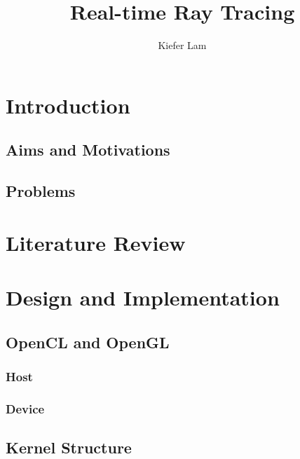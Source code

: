 \documentclass[final]{cmpreport}
\title{Real-time Ray Tracing}
\author{Kiefer Lam}
\begin{document}
\section{Introduction}

\subsection{Aims and Motivations}

\subsection{Problems}

\section{Literature Review}

\section{Design and Implementation}

\subsection{OpenCL and OpenGL}
\subsubsection{Host}

\subsubsection{Device}

\subsection{Kernel Structure}
\end{document}
